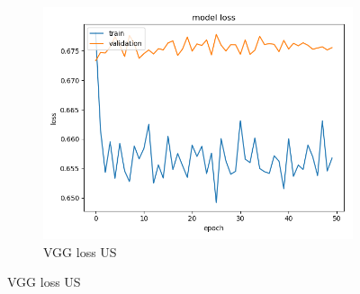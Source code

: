 \begin{figure}
\begin{subfigure}[b]{.3\linewidth}
\includegraphics[width=\linewidth]{Figs/vgg_us_loss.jpg}
\caption{VGG loss US}
\end{subfigure}


\end{figure}
